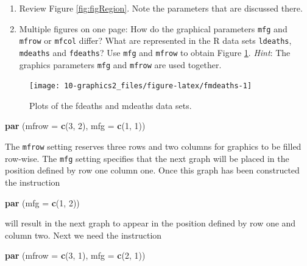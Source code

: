 \documentclass[
]{book}
\newenvironment{Shaded}{\begin{snugshade}}{\end{snugshade}}
\newcommand{\AttributeTok}[1]{\textcolor[rgb]{0.13,0.29,0.53}{#1}}
\newcommand{\DecValTok}[1]{\textcolor[rgb]{0.00,0.00,0.81}{#1}}
\newcommand{\FunctionTok}[1]{\textcolor[rgb]{0.13,0.29,0.53}{\textbf{#1}}}
\newcommand{\NormalTok}[1]{#1}
\begin{document}
\begin{enumerate}
\def\labelenumi{(\alph{enumi})}
\item
  Review Figure \ref{fig:figRegion}. Note the parameters that are discussed there.
\item
  Multiple figures on one page: How do the graphical parameters \texttt{mfg} and \texttt{mfrow} or \texttt{mfcol} differ? What are represented in the R data sets \texttt{ldeaths}, \texttt{mdeaths} and \texttt{fdeaths}? Use \texttt{mfg} and \texttt{mfrow} to obtain Figure \ref{fig:fmdeaths}. \emph{Hint}: The graphics parameters \texttt{mfg} and \texttt{mfrow} are used together.
\end{enumerate}

\begin{figure}
\texttt{[image: 10-graphics2\_files/figure-latex/fmdeaths-1]} \caption{Plots of the fdeaths and mdeaths data sets.}\label{fig:fmdeaths}
\end{figure}

\begin{Shaded}
\begin{Highlighting}[]
\FunctionTok{par}\NormalTok{ (}\AttributeTok{mfrow =} \FunctionTok{c}\NormalTok{(}\DecValTok{3}\NormalTok{, }\DecValTok{2}\NormalTok{), }\AttributeTok{mfg =} \FunctionTok{c}\NormalTok{(}\DecValTok{1}\NormalTok{, }\DecValTok{1}\NormalTok{))}
\end{Highlighting}
\end{Shaded}

The \texttt{mfrow} setting reserves three rows and two columns for graphics to be filled row-wise. The \texttt{mfg} setting specifies that the next graph will be placed in the position defined by row one column one. Once this graph has been constructed the instruction

\begin{Shaded}
\begin{Highlighting}[]
\FunctionTok{par}\NormalTok{ (}\AttributeTok{mfg =} \FunctionTok{c}\NormalTok{(}\DecValTok{1}\NormalTok{, }\DecValTok{2}\NormalTok{))}
\end{Highlighting}
\end{Shaded}

will result in the next graph to appear in the position defined by row one and column two. Next we need the instruction

\begin{Shaded}
\begin{Highlighting}[]
\FunctionTok{par}\NormalTok{ (}\AttributeTok{mfrow =} \FunctionTok{c}\NormalTok{(}\DecValTok{3}\NormalTok{, }\DecValTok{1}\NormalTok{), }\AttributeTok{mfg =} \FunctionTok{c}\NormalTok{(}\DecValTok{2}\NormalTok{, }\DecValTok{1}\NormalTok{))}
\end{Highlighting}
\end{Shaded}
\end{document}
